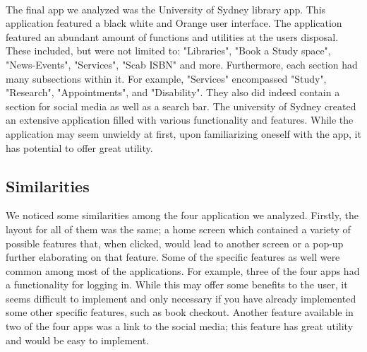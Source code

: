             \paragraph{}
            The final app we analyzed was the University of Sydney library app. This application featured a black white and Orange user interface. The application featured an abundant amount of functions and utilities at the users disposal. These included, but were not limited to: "Libraries", "Book a Study space", "News-Events", "Services", "Scab ISBN" and more. Furthermore, each section had many subsections within it. For example, "Services" encompassed "Study", "Research", "Appointments", and "Disability". They also did indeed contain a section for social media as well as a search bar. The university of Sydney created an extensive application filled with various functionality and features. While the application may seem unwieldy at first, upon familiarizing oneself with the app, it has potential to offer great utility.  
            
        \subsection{Similarities}
        We noticed some similarities among the four application we analyzed. Firstly, the layout for all of them was the same; a home screen which contained a variety of possible features that, when clicked, would lead to another screen or a pop-up further elaborating on that feature. Some of the specific features as well were common among most of the applications. For example, three of the four apps had a functionality for logging in. While this may offer some benefits to the user, it seems difficult to implement and only necessary if you have already implemented some other specific features, such as book checkout. Another feature available in two of the four apps was a link to the social media; this feature has great utility and would be easy to implement.